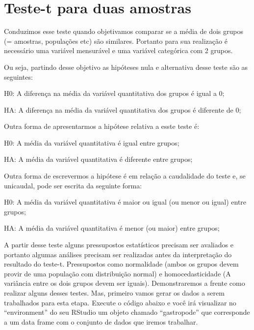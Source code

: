 \documentclass[titlepage, oneside, openany, a4paper]{book}
\begin{document}
\hypertarget{teste-t-para-duas-amostras}{%
\section{Teste-t para duas amostras}\label{teste-t-para-duas-amostras}}

Conduzimos esse teste quando objetivamos comparar se a média de dois grupos (= amostras, populações etc) são similares. Portanto para sua realização é necessário uma variável mensurável e uma variável categórica com 2 grupos.

Ou seja, partindo desse objetivo as hipóteses nula e alternativa desse teste são as seguintes:

H0: A diferença na média da variável quantitativa dos grupos é igual a 0;

HA: A diferença na média da variável quantitativa dos grupos é diferente de 0;

Outra forma de apresentarmos a hipótese relativa a esste teste é:

H0: A média da variável quantitativa é igual entre grupos;

HA: A média da variável quantitativa é diferente entre grupos;

Outra forma de escrevermos a hipótese é em relação a caudalidade do teste e, se unicaudal, pode ser escrita da seguinte forma:

H0: A média da variável quantitativa é maior ou igual (ou menor ou igual) entre grupos;

HA: A média da variável quantitativa é menor (ou maior) entre grupos;

A partir desse teste alguns pressupostos estatísticos precisam ser avaliados e portanto algumas análises precisam ser realizadas antes da interpretação do resultado do teste-t. Pressupostos como normalidade (ambos os grupos devem provir de uma população com distribuição normal) e homocedasticidade (A variância entre os dois grupos devem ser iguais). Demonstraremos a frente como realizar alguns desses testes. Mas, primeiro vamos gerar os dados a serem trabalhados para esta etapa. Execute o código abaixo e você irá visualizar no ``environment'' do seu RStudio um objeto chamado ``gastropode'' que corresponde a um data frame com o conjunto de dados que iremos trabalhar.
\end{document}
